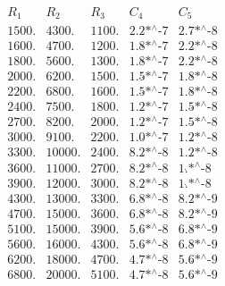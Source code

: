 \documentclass{llncs}
\begin{document}
	\begin{table}[!h]
$$
	  \begin{array}{|c|c|c|c|c|}
		\hline
		R_1    & R_2  & R_3   & C_4  & C_5 \\
		\hline
		1500. & 4300. & 1100. & \text{2.2$\grave{ }$*${}^{\wedge}$-7} & \text{2.7$\grave{ }$*${}^{\wedge}$-8} \\
		1600. & 4700. & 1200. & \text{1.8$\grave{ }$*${}^{\wedge}$-7} & \text{2.2$\grave{ }$*${}^{\wedge}$-8} \\
		1800. & 5600. & 1300. & \text{1.8$\grave{ }$*${}^{\wedge}$-7} & \text{2.2$\grave{ }$*${}^{\wedge}$-8} \\
		2000. & 6200. & 1500. & \text{1.5$\grave{ }$*${}^{\wedge}$-7} & \text{1.8$\grave{ }$*${}^{\wedge}$-8} \\
		2200. & 6800. & 1600. & \text{1.5$\grave{ }$*${}^{\wedge}$-7} & \text{1.8$\grave{ }$*${}^{\wedge}$-8} \\
		2400. & 7500. & 1800. & \text{1.2$\grave{ }$*${}^{\wedge}$-7} & \text{1.5$\grave{ }$*${}^{\wedge}$-8} \\
		2700. & 8200. & 2000. & \text{1.2$\grave{ }$*${}^{\wedge}$-7} & \text{1.5$\grave{ }$*${}^{\wedge}$-8} \\
		3000. & 9100. & 2200. & \text{1.0$\grave{ }$*${}^{\wedge}$-7} & \text{1.2$\grave{ }$*${}^{\wedge}$-8} \\
		3300. & 10000. & 2400. & \text{8.2$\grave{ }$*${}^{\wedge}$-8} & \text{1.2$\grave{ }$*${}^{\wedge}$-8} \\
		3600. & 11000. & 2700. & \text{8.2$\grave{ }$*${}^{\wedge}$-8} & \text{1.$\grave{ }$*${}^{\wedge}$-8} \\
		3900. & 12000. & 3000. & \text{8.2$\grave{ }$*${}^{\wedge}$-8} & \text{1.$\grave{ }$*${}^{\wedge}$-8} \\
		4300. & 13000. & 3300. & \text{6.8$\grave{ }$*${}^{\wedge}$-8} & \text{8.2$\grave{ }$*${}^{\wedge}$-9} \\
		4700. & 15000. & 3600. & \text{6.8$\grave{ }$*${}^{\wedge}$-8} & \text{8.2$\grave{ }$*${}^{\wedge}$-9} \\
		5100. & 15000. & 3900. & \text{5.6$\grave{ }$*${}^{\wedge}$-8} & \text{6.8$\grave{ }$*${}^{\wedge}$-9} \\
		5600. & 16000. & 4300. & \text{5.6$\grave{ }$*${}^{\wedge}$-8} & \text{6.8$\grave{ }$*${}^{\wedge}$-9} \\
		6200. & 18000. & 4700. & \text{4.7$\grave{ }$*${}^{\wedge}$-8} & \text{5.6$\grave{ }$*${}^{\wedge}$-9} \\
		6800. & 20000. & 5100. & \text{4.7$\grave{ }$*${}^{\wedge}$-8} & \text{5.6$\grave{ }$*${}^{\wedge}$-9} \\

\end{array}$$
\end{table}
\end{document}
